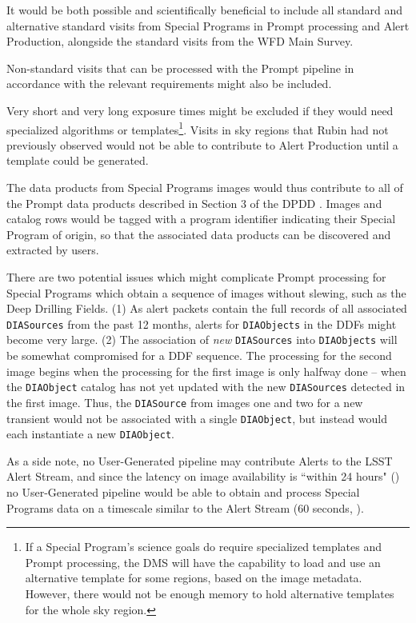 \documentclass[DM,lsstdoc,toc]{lsstdoc}
\begin{document}
It would be both possible and scientifically beneficial to include all standard and alternative standard visits from Special Programs in Prompt processing and Alert Production, alongside the standard visits from the WFD Main Survey.

Non-standard visits that can be processed with the Prompt pipeline in accordance with the relevant requirements might also be included.

Very short and very long exposure times might be excluded if they would need specialized algorithms or templates\footnote{If a Special Program's science goals do require specialized templates and Prompt processing, the DMS will have the capability to load and use an alternative template for some regions, based on the image metadata. However, there would not be enough memory to hold alternative templates for the whole sky region.}.
Visits in sky regions that Rubin had not previously observed would not be able to contribute to Alert Production until a template could be generated.

The data products from Special Programs images would thus contribute to all of the Prompt data products described in Section 3 of the DPDD . 
Images and catalog rows would be tagged with a program identifier indicating their Special Program of origin, so that the associated data products can be discovered and extracted by users.

There are two potential issues which might complicate Prompt processing for Special Programs which obtain a sequence of images without slewing, such as the Deep Drilling Fields.
(1) As alert packets contain the full records of all associated {\tt DIASources} from the past 12 months, alerts for {\tt DIAObjects} in the DDFs might become very large.
(2) The association of {\it new} {\tt DIASources} into {\tt DIAObjects} will be somewhat compromised for a DDF sequence.
The processing for the second image begins when the processing for the first image is only halfway done -- when the {\tt DIAObject} catalog has not yet updated with the new {\tt DIASources} detected in the first image.
Thus, the {\tt DIASource} from images one and two for a new transient would not be associated with a single {\tt DIAObject}, but instead would each instantiate a new {\tt DIAObject}.

As a side note, no User-Generated pipeline may contribute Alerts to the LSST Alert Stream, and since the latency on image availability is ``within 24 hours" () no User-Generated pipeline would be able to obtain and process Special Programs data on a timescale similar to the Alert Stream (60 seconds, ).
\end{document}
